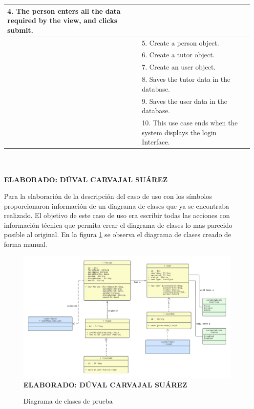 \begin{table}[h!]
\begin{tabular}{| p{7cm} | p{7cm} |}
		4. The person enters all the data required by the view, and clicks submit. & \\ \hline
		& 5. Create a person object. \\ \hline
		& 6. Create a tutor object. \\ \hline
		& 7. Create an user object. \\ \hline
		& 8. Saves the tutor data in the database. \\ \hline
		& 9. Saves the user data in the database. \\ \hline
		& 10. This use case ends when the system displays the login Interface.  \\ \hline
	\end{tabular} \\
	\textbf{ \\ ELABORADO: DÚVAL CARVAJAL SUÁREZ}
\end{table}

Para la elaboración de la descripción del caso de uso con los símbolos proporcionaron información de un diagrama de clases que ya se encontraba realizado. El objetivo de este caso de uso era escribir todas las acciones con información técnica que permita crear el diagrama de clases lo mas parecido posible al original. En la figura \ref{fig:cdtest} se observa el diagrama de clases creado de forma manual.

\begin{figure}[h!]
	\caption{Diagrama de clases de prueba}
	\includegraphics[width=15.5cm]{img/cdtest.png}
	\label{fig:cdtest}
	\textbf{\\ ELABORADO: DÚVAL CARVAJAL SUÁREZ}
\end{figure}

